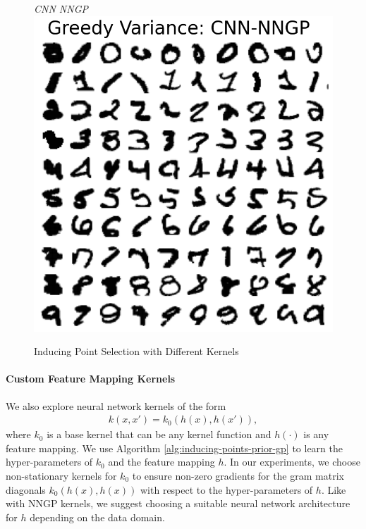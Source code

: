 \documentclass{article}
\numberwithin{equation}{section}
\begin{document}
\begin{figure}[h!]
\begin{minipage}{.25\textwidth}
\end{minipage}%
\begin{minipage}{.25\textwidth}
  \centering
  \textit{CNN NNGP}
  \includegraphics[width=\linewidth, trim={0 0 0 1.5cm},clip]{thesis-report/figures/mnist_inducing_point/greedy_mnist_cnn_nngp_inducing_point_selection.png}
\end{minipage}%
\caption{Inducing Point Selection with Different Kernels}\label{fig:mnist-inducing-points}
\end{figure}


\paragraph{Custom Feature Mapping Kernels} We also explore neural network kernels of the form
\begin{align}
    k(x, x') = k_0(h(x), h(x')),
    \label{custom-feature-map-kernel}
\end{align}
where $k_0$ is a base kernel that can be any kernel function and $h(\cdot)$ is any feature mapping. 
We use Algorithm \ref{alg:inducing-points-prior-gp} to learn the hyper-parameters of $k_0$ and the  feature mapping $h$. 
In our experiments, we choose non-stationary kernels for $k_0$ to ensure non-zero gradients for the gram matrix diagonals $k_0(h(x), h(x))$ with respect to the hyper-parameters of $h$. 
Like with NNGP kernels, we suggest choosing a suitable neural network architecture for $h$ depending on the data domain.
\end{document}
